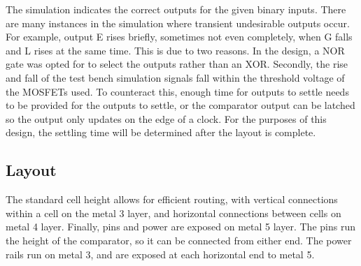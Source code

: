 The simulation indicates the correct outputs for the given binary inputs. There are many instances 
in the simulation where transient undesirable outputs occur. For example, output E rises briefly, 
sometimes not even completely, when G falls and L rises at the same time. 
This is due to two reasons. In the design, a NOR gate was opted for to select the outputs rather 
than an XOR. Secondly, the rise and fall of the test bench simulation signals fall within the 
threshold voltage of the MOSFETs used. To counteract this, enough time for outputs to settle 
needs to be provided for the outputs to settle, or the comparator output can be latched 
so the output only updates on the edge of a clock. For the purposes of this design, the 
settling time will be determined after the layout is complete. 
\subsection{Layout}
The standard cell height allows for efficient routing, with vertical connections within a 
cell on the metal 3 layer, and horizontal connections between cells on metal 4 layer. 
Finally, pins and power are exposed on metal 5 layer. The pins run the height of the comparator,
so it can be connected from either end. The power rails run on metal 3, and are exposed 
at each horizontal end to metal 5. 

